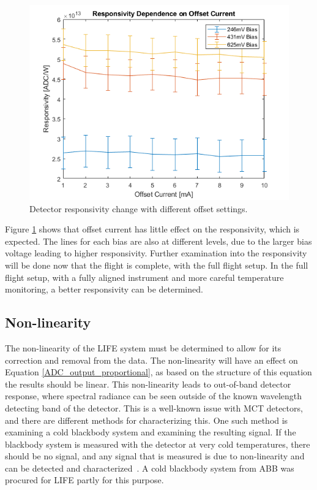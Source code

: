 \begin{figure}[h]
  \includegraphics[width=\linewidth]{chap6_images/verification/resp_dependence_on_offset.png}
  \caption{Detector responsivity change with different offset settings.}
  \label{fig:resp_dep_on_offset}
\end{figure}

Figure \ref{fig:resp_dep_on_offset} shows that offset current has little effect on the responsivity, which is expected. The lines for each bias are also at different levels, due to the larger bias voltage leading to higher responsivity. Further examination into the responsivity will be done now that the flight is complete, with the full flight setup. In the full flight setup, with a fully aligned instrument and more careful temperature monitoring, a better responsivity can be determined.

\subsection{Non-linearity}
The non-linearity of the LIFE system must be determined to allow for its correction and removal from the data. The non-linearity will have an effect on Equation \ref{ADC_output_proportional}, as based on the structure of this equation the results should be linear. This non-linearity leads to out-of-band detector response, where spectral radiance can be seen outside of the known wavelength detecting band of the detector. This is a well-known issue with MCT detectors, and there are different methods for characterizing this. One such method is examining a cold blackbody system and examining the resulting signal. If the blackbody system is measured with the detector at very cold temperatures, there should be no signal, and any signal that is measured is due to non-linearity and can be detected and characterized~\cite{non-linearity_correction}. A cold blackbody system from ABB was procured for LIFE partly for this purpose.

